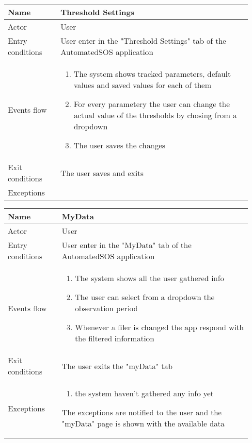 \begin{table}[h!]
\begin{tabular}{|l|p{12cm}|}
\hline
Name             & Threshold Settings \\ \hline
Actor            & User \\ \hline
Entry conditions & User enter in the "Threshold Settings" tab of the AutomatedSOS application \\ \hline
Events flow      & \begin{enumerate}
\item The system shows tracked parameters, default values and saved values for each of them
\item For every parametery the user can change the actual value of the thresholds by chosing from a dropdown
\item The user saves the changes
\end{enumerate} \\ \hline
Exit conditions  & The user saves and exits \\ \hline
Exceptions       &  \\ \hline
\end{tabular}
\end{table}

\begin{table}[h!]
\begin{tabular}{|l|p{12cm}|}
\hline
Name             & MyData \\ \hline
Actor            & User \\ \hline
Entry conditions & User enter in the "MyData" tab of the AutomatedSOS application \\ \hline
Events flow      & \begin{enumerate}
\item The system shows all the user gathered info
\item The user can select from a dropdown the observation period
\item Whenever a filer is changed the app respond with the filtered information
\end{enumerate} \\ \hline
Exit conditions  & The user exits the "myData" tab \\ \hline
Exceptions       & \begin{enumerate}
\item the system haven't gathered any info yet
\end{enumerate} The exceptions are notified to the user and the "myData" page is shown with the available data \\ \hline
\end{tabular}
\end{table}

